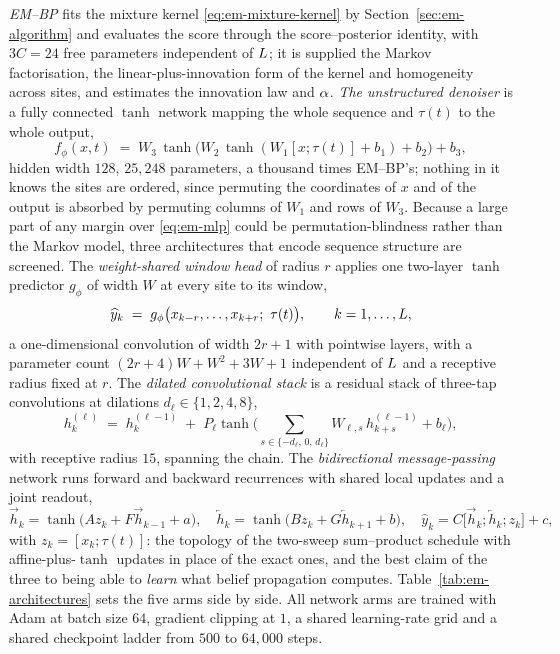 \emph{EM--BP} fits the mixture kernel \eqref{eq:em-mixture-kernel} by
Section~\ref{sec:em-algorithm} and evaluates the score through the
score--posterior identity, with $3C = 24$ free parameters independent of
$L$; it is supplied the Markov factorisation, the
linear-plus-innovation form of the kernel and homogeneity across sites, and
estimates the innovation law and $\alpha$. \emph{The unstructured denoiser} is
a fully connected $\tanh$ network mapping the whole sequence and $\tau(t)$ to
the whole output,
\begin{equation}
  f_\phi(x,t) \;=\; W_3\,\tanh\!\big(W_2\,\tanh(W_1 [x;\tau(t)] + b_1) + b_2\big) + b_3,
  \label{eq:em-mlp}
\end{equation}
hidden width $128$, $25{,}248$ parameters, a thousand times EM--BP's; nothing
in it knows the sites are ordered, since permuting the coordinates of $x$ and
of the output is absorbed by permuting columns of $W_1$ and rows of $W_3$.
Because a large part of any margin over \eqref{eq:em-mlp} could be
permutation-blindness rather than the Markov model, three architectures that
encode sequence structure are screened. The \emph{weight-shared window head}
of radius $r$ applies one two-layer $\tanh$ predictor $g_\phi$ of width $W$
at every site to its window,
\begin{equation}
  \widehat{y}_k \;=\; g_\phi\big(x_{k-r},\dots,x_{k+r};\ \tau(t)\big),
  \qquad k = 1,\dots,L,
  \label{eq:em-window}
\end{equation}
a one-dimensional convolution of width $2r+1$ with pointwise layers, with a
parameter count $(2r+4)W + W^2 + 3W + 1$ independent of $L$ and a
receptive radius fixed at $r$. The \emph{dilated convolutional stack} is a
residual stack of three-tap convolutions at dilations $d_\ell \in \{1,2,4,8\}$,
\begin{equation}
  h^{(\ell)}_k \;=\; h^{(\ell-1)}_k
  \;+\; P_\ell \tanh\!\Big(\textstyle\sum_{s \in \{-d_\ell,\,0,\,d_\ell\}} W_{\ell,s}\, h^{(\ell-1)}_{k+s} + b_\ell\Big),
  \label{eq:em-dilated}
\end{equation}
with receptive radius $15$, spanning the chain. The \emph{bidirectional
message-passing} network runs forward and backward recurrences with shared
local updates and a joint readout,
\begin{equation}
  \overrightarrow{h}_k = \tanh\!\big(A z_k + F \overrightarrow{h}_{k-1} + a\big),
  \quad
  \overleftarrow{h}_k = \tanh\!\big(B z_k + G \overleftarrow{h}_{k+1} + b\big),
  \quad
  \widehat{y}_k = C\big[\overrightarrow{h}_k; \overleftarrow{h}_k; z_k\big] + c,
  \label{eq:em-bimp}
\end{equation}
with $z_k = [x_k;\tau(t)]$: the topology of the two-sweep sum--product
schedule with affine-plus-$\tanh$ updates in place of the exact ones, and the
best claim of the three to being able to \emph{learn} what belief
propagation computes. Table~\ref{tab:em-architectures} sets the five arms
side by side. All network arms are trained with Adam at batch size $64$,
gradient clipping at $1$, a shared learning-rate grid and a shared checkpoint
ladder from $500$ to $64{,}000$ steps.

